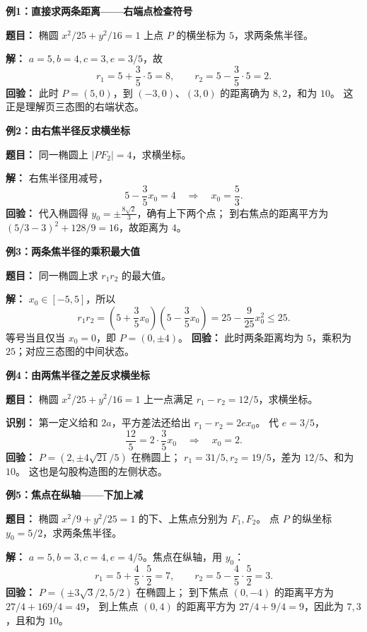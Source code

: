 \clearpage
\begin{examplebox}
\textbf{\textcolor{CExample}{例1：直接求两条距离——右端点检查符号}}

\textbf{题目：} 椭圆 $x^2/25+y^2/16=1$ 上点 $P$ 的横坐标为 $5$，求两条焦半径。

\textbf{解：} $a=5,b=4,c=3,e=3/5$，故
\[
r_1=5+\frac35\cdot5=\boxed8,\qquad r_2=5-\frac35\cdot5=\boxed2.
\]
\textbf{回验：} 此时 $P=(5,0)$，到 $(-3,0)$、$(3,0)$ 的距离确为 $8,2$，和为 $10$。
这正是理解页三态图的右端状态。

\medskip
\textbf{\textcolor{CExample}{例2：由右焦半径反求横坐标}}

\textbf{题目：} 同一椭圆上 $|PF_2|=4$，求横坐标。

\textbf{解：} 右焦半径用减号，
\[
5-\frac35x_0=4\quad\Longrightarrow\quad \boxed{x_0=\frac53}.
\]
\textbf{回验：} 代入椭圆得 $y_0=\pm\frac{8\sqrt2}{3}$，确有上下两个点；
到右焦点的距离平方为 $(5/3-3)^2+128/9=16$，故距离为 $4$。

\medskip
\textbf{\textcolor{CExample}{例3：两条焦半径的乘积最大值}}

\textbf{题目：} 同一椭圆上求 $r_1r_2$ 的最大值。

\textbf{解：} $x_0\in[-5,5]$，所以
\[
r_1r_2=\left(5+\frac35x_0\right)\left(5-\frac35x_0\right)
=25-\frac9{25}x_0^2\le\boxed{25}.
\]
等号当且仅当 $x_0=0$，即 $P=(0,\pm4)$。
\textbf{回验：} 此时两条距离均为 $5$，乘积为 $25$；对应三态图的中间状态。
\end{examplebox}
\clearpage
\begin{examplebox}
\textbf{\textcolor{CExample}{例4：由两焦半径之差反求横坐标}}

\textbf{题目：} 椭圆 $x^2/25+y^2/16=1$ 上一点满足 $r_1-r_2=12/5$，求横坐标。

\textbf{识别：} 第一定义给和 $2a$，平方差法还给出 $r_1-r_2=2ex_0$。
代 $e=3/5$，
\[
\frac{12}{5}=2\cdot\frac35x_0\quad\Longrightarrow\quad\boxed{x_0=2}.
\]
\textbf{回验：} $P=(2,\pm4\sqrt{21}/5)$ 在椭圆上；
$r_1=31/5,r_2=19/5$，差为 $12/5$、和为 $10$。
这也是勾股构造图的左侧状态。

\medskip
\textbf{\textcolor{CExample}{例5：焦点在纵轴——下加上减}}

\textbf{题目：} 椭圆 $x^2/9+y^2/25=1$ 的下、上焦点分别为 $F_1,F_2$。
点 $P$ 的纵坐标 $y_0=5/2$，求两条焦半径。

\textbf{解：} $a=5,b=3,c=4,e=4/5$。焦点在纵轴，用 $y_0$：
\[
r_1=5+\frac45\cdot\frac52=\boxed7,\qquad
r_2=5-\frac45\cdot\frac52=\boxed3.
\]
\textbf{回验：} $P=(\pm3\sqrt3/2,5/2)$ 在椭圆上；
到下焦点 $(0,-4)$ 的距离平方为 $27/4+169/4=49$，
到上焦点 $(0,4)$ 的距离平方为 $27/4+9/4=9$，因此为 $7,3$，且和为 $10$。
\end{examplebox}

